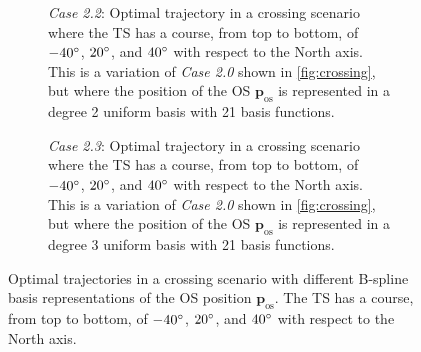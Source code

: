 \begin{figure}
    \centering
    \begin{subfigure}[b]{\textwidth}
        \centering
        
        \caption{\emph{Case 2.2}: Optimal trajectory in a crossing scenario where the TS has a course, from top to bottom, of $-40\degree$, $20\degree$, and $40\degree$ with respect to the North axis. This is a variation of \emph{Case 2.0} shown in \cref{fig:crossing}, but where the position of the OS $\mathbf p_\text{os}$ is represented in a degree 2 uniform basis with 21 basis functions.}
        \label{fig:crossing-advanced-scenario-20-2-traj}        
    \end{subfigure}
    \begin{subfigure}[b]{\textwidth}
        \centering
        
        \caption{\emph{Case 2.3}: Optimal trajectory in a crossing scenario where the TS has a course, from top to bottom, of $-40\degree$, $20\degree$, and $40\degree$ with respect to the North axis. This is a variation of \emph{Case 2.0} shown in \cref{fig:crossing}, but where the position of the OS $\mathbf p_\text{os}$ is represented in a degree 3 uniform basis with 21 basis functions.}
        \label{fig:crossing-advanced-scenario-20-3-traj}
    \end{subfigure}
    \caption{Optimal trajectories in a crossing scenario with different B-spline basis representations of the OS position $\mathbf p_\text{os}$. The TS has a course, from top to bottom, of $-40\degree$, $20\degree$, and $40\degree$ with respect to the North axis.}
\end{figure}